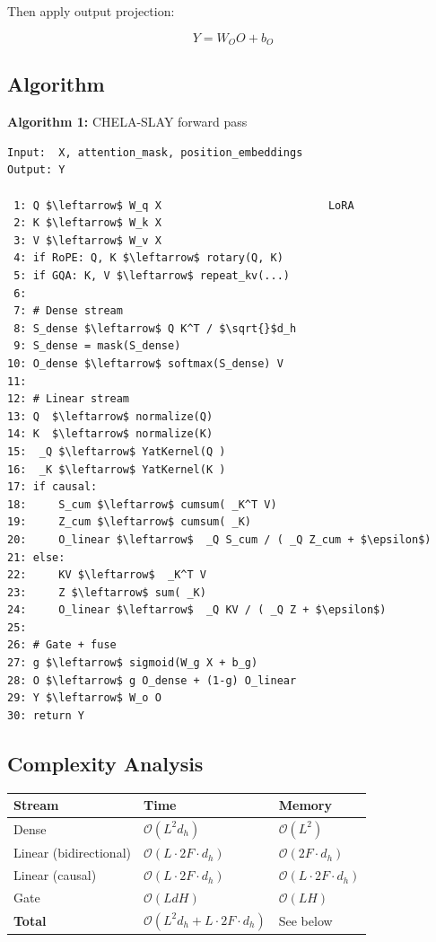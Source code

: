 Then apply output projection:

\[
Y = W_O O + b_O
\]

\subsection{Algorithm}

\textbf{Algorithm 1:} CHELA-SLAY forward pass
\begin{lstlisting}
Input:  X, attention_mask, position_embeddings
Output: Y

 1: Q $\leftarrow$ W_q X                          LoRA
 2: K $\leftarrow$ W_k X
 3: V $\leftarrow$ W_v X
 4: if RoPE: Q, K $\leftarrow$ rotary(Q, K)
 5: if GQA: K, V $\leftarrow$ repeat_kv(...)
 6:
 7: # Dense stream
 8: S_dense $\leftarrow$ Q K^T / $\sqrt{}$d_h
 9: S_dense = mask(S_dense)
10: O_dense $\leftarrow$ softmax(S_dense) V
11:
12: # Linear stream
13: Q  $\leftarrow$ normalize(Q)
14: K  $\leftarrow$ normalize(K)
15:  _Q $\leftarrow$ YatKernel(Q )
16:  _K $\leftarrow$ YatKernel(K )
17: if causal:
18:     S_cum $\leftarrow$ cumsum( _K^T V)
19:     Z_cum $\leftarrow$ cumsum( _K)
20:     O_linear $\leftarrow$  _Q S_cum / ( _Q Z_cum + $\epsilon$)
21: else:
22:     KV $\leftarrow$  _K^T V
23:     Z $\leftarrow$ sum( _K)
24:     O_linear $\leftarrow$  _Q KV / ( _Q Z + $\epsilon$)
25:
26: # Gate + fuse
27: g $\leftarrow$ sigmoid(W_g X + b_g)
28: O $\leftarrow$ g O_dense + (1-g) O_linear
29: Y $\leftarrow$ W_o O
30: return Y
\end{lstlisting}

\subsection{Complexity Analysis}

\begin{table}[H]
\centering
\small
\begin{tabular}{lll}
\toprule
\textbf{Stream} & \textbf{Time} & \textbf{Memory} \\
\midrule
Dense & $\mathcal{O}(L^2 d_h)$ & $\mathcal{O}(L^2)$ \\
Linear (bidirectional) & $\mathcal{O}(L \cdot 2F \cdot d_h)$ & $\mathcal{O}(2F \cdot d_h)$ \\
Linear (causal) & $\mathcal{O}(L \cdot 2F \cdot d_h)$ & $\mathcal{O}(L \cdot 2F \cdot d_h)$ \\
Gate & $\mathcal{O}(L d H)$ & $\mathcal{O}(L H)$ \\
\textbf{Total} & $\mathcal{O}(L^2 d_h + L \cdot 2F \cdot d_h)$ & See below \\
\bottomrule
\end{tabular}
\end{table}

